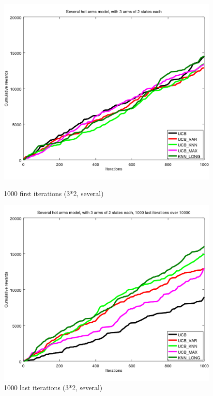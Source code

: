 \documentclass{article} %
\begin{document}
\begin{figure}[h]
	\begin{minipage}[b]{.49\linewidth}
		\includegraphics[width=1.0\textwidth]{begin_m_1000it.png}
		\caption{1000 first iterations (3*2, several)}
	\end{minipage}
	\hfill
	\begin{minipage}[b]{0.49\linewidth}
		\includegraphics[width=1.0\textwidth]{last_m_1000it.png}
		\caption{1000 last iterations (3*2, several)}
	\end{minipage}
	\label{fig:f}
\end{figure}
\end{document}
